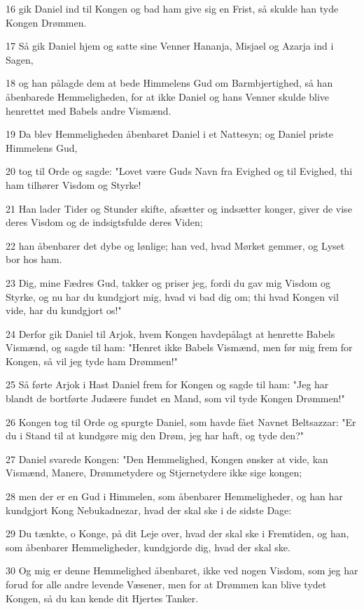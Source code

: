 \par 16 gik Daniel ind til Kongen og bad ham give sig en Frist, så skulde han tyde Kongen Drømmen.
\par 17 Så gik Daniel hjem og satte sine Venner Hananja, Misjael og Azarja ind i Sagen,
\par 18 og han pålagde dem at bede Himmelens Gud om Barmbjertighed, så han åbenbarede Hemmeligheden, for at ikke Daniel og hans Venner skulde blive henrettet med Babels andre Vismænd.
\par 19 Da blev Hemmeligheden åbenbaret Daniel i et Nattesyn; og Daniel priste Himmelens Gud,
\par 20 tog til Orde og sagde: "Lovet være Guds Navn fra Evighed og til Evighed, thi ham tilhører Visdom og Styrke!
\par 21 Han lader Tider og Stunder skifte, afsætter og indsætter konger, giver de vise deres Visdom og de indsigtsfulde deres Viden;
\par 22 han åbenbarer det dybe og lønlige; han ved, hvad Mørket gemmer, og Lyset bor hos ham.
\par 23 Dig, mine Fædres Gud, takker og priser jeg, fordi du gav mig Visdom og Styrke, og nu har du kundgjort mig, hvad vi bad dig om; thi hvad Kongen vil vide, har du kundgjort os!"
\par 24 Derfor gik Daniel til Arjok, hvem Kongen havdepålagt at henrette Babels Vismænd, og sagde til ham: "Henret ikke Babels Vismænd, men før mig frem for Kongen, så vil jeg tyde ham Drømmen!"
\par 25 Så førte Arjok i Hast Daniel frem for Kongen og sagde til ham: "Jeg har blandt de bortførte Judæere fundet en Mand, som vil tyde Kongen Drømmen!"
\par 26 Kongen tog til Orde og spurgte Daniel, som havde fået Navnet Beltsazzar: "Er du i Stand til at kundgøre mig den Drøm, jeg har haft, og tyde den?"
\par 27 Daniel svarede Kongen: "Den Hemmelighed, Kongen ønsker at vide, kan Vismænd, Manere, Drømmetydere og Stjernetydere ikke sige kongen;
\par 28 men der er en Gud i Himmelen, som åbenbarer Hemmeligheder, og han har kundgjort Kong Nebukadnezar, hvad der skal ske i de sidste Dage:
\par 29 Du tænkte, o Konge, på dit Leje over, hvad der skal ske i Fremtiden, og han, som åbenbarer Hemmeligheder, kundgjorde dig, hvad der skal ske.
\par 30 Og mig er denne Hemmelighed åbenbaret, ikke ved nogen Visdom, som jeg har forud for alle andre levende Væsener, men for at Drømmen kan blive tydet Kongen, så du kan kende dit Hjertes Tanker.
